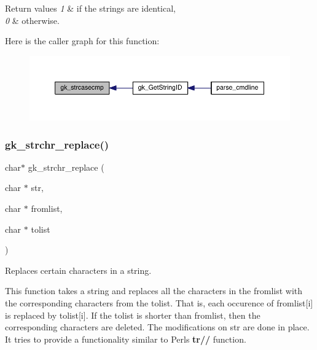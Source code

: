 \begin{DoxyRetVals}{Return values}
{\em 1} & if the strings are identical, \\
\hline
{\em 0} & otherwise. \\
\hline
\end{DoxyRetVals}
Here is the caller graph for this function\+:\nopagebreak
\begin{figure}[H]
\begin{center}
\leavevmode
\includegraphics[width=350pt]{a00143_a47570da67818e57e97fdd464bc60fbd1_icgraph}
\end{center}
\end{figure}
\mbox{\label{a00143_a29b909254dcbcae417f8c09ce21d5423}} 
\subsubsection{\texorpdfstring{gk\+\_\+strchr\+\_\+replace()}{gk\_strchr\_replace()}}
{\footnotesize\ttfamily char$\ast$ gk\+\_\+strchr\+\_\+replace (\begin{DoxyParamCaption}\item[{char $\ast$}]{str,  }\item[{char $\ast$}]{fromlist,  }\item[{char $\ast$}]{tolist }\end{DoxyParamCaption})}



Replaces certain characters in a string. 

This function takes a string and replaces all the characters in the {\ttfamily fromlist} with the corresponding characters from the {\ttfamily tolist}. That is, each occurence of {\ttfamily fromlist\mbox{[}i\mbox{]}} is replaced by {\ttfamily tolist\mbox{[}i\mbox{]}}. If the {\ttfamily tolist} is shorter than {\ttfamily fromlist}, then the corresponding characters are deleted. The modifications on {\ttfamily str} are done in place. It tries to provide a functionality similar to Perl\textquotesingle{}s {\bfseries tr//} function.



